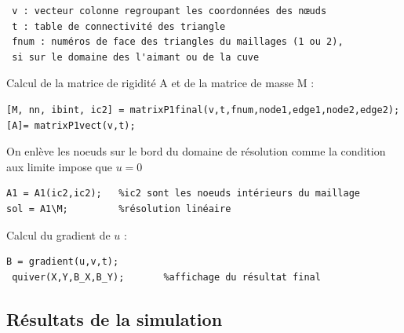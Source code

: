 \documentclass[a4paper,12pt,titlepage]{report}
\begin{document}
\begin{onehalfspace}
\begin{verbatim}
 v : vecteur colonne regroupant les coordonnées des nœuds
 t : table de connectivité des triangle
 fnum : numéros de face des triangles du maillages (1 ou 2), 
 si sur le domaine des l'aimant ou de la cuve
\end{verbatim}
Calcul de la matrice de rigidité A et de la matrice de masse M : 
\begin{verbatim}
[M, nn, ibint, ic2] = matrixP1final(v,t,fnum,node1,edge1,node2,edge2);
[A]= matrixP1vect(v,t);
\end{verbatim}

On enlève les noeuds sur le bord du domaine de résolution comme la condition aux limite impose que $u = 0$ 
\begin{verbatim}
A1 = A1(ic2,ic2);	%ic2 sont les noeuds intérieurs du maillage
sol = A1\M;			%résolution linéaire
\end{verbatim}
Calcul du gradient de $u$ :
\begin{verbatim}
B = gradient(u,v,t);
 quiver(X,Y,B_X,B_Y);		%affichage du résultat final
\end{verbatim}

 
\subsection{Résultats de la simulation}


\end{onehalfspace}
\end{document}
